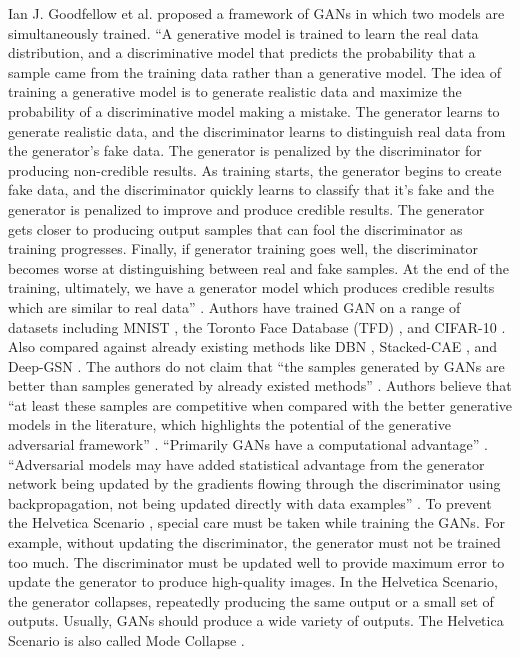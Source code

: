 Ian J. Goodfellow et al.\cite{goodfellow2014generative} proposed a framework of \acp{GAN} in which two models are simultaneously trained. ``A generative model is trained to learn the real data distribution, and a discriminative model that predicts the probability that a sample came from the training data rather than a generative model. The idea of training a generative model is to generate realistic data and maximize the probability of a discriminative model making a mistake. The generator learns to generate realistic data, and the discriminator learns to distinguish real data from the generator's fake data. The generator is penalized by the discriminator for producing non-credible results. As training starts, the generator begins to create fake data, and the discriminator quickly learns to classify that it's fake and the generator is penalized to improve and produce credible results. The generator gets closer to producing output samples that can fool the discriminator as training progresses. Finally, if generator training goes well, the discriminator becomes worse at distinguishing between real and fake samples.  At the end of the training, ultimately, we have a generator model which produces credible results which are similar to real data'' \cite{goodfellow2014generative}. Authors have trained \ac{GAN} on a range of datasets including MNIST \cite{726791}, the Toronto Face Database (TFD) \cite{susskind2010toronto}, and CIFAR-10 \cite{krizhevsky2009learning}. Also compared against already existing methods like \ac{DBN} \cite{bengio2012better}, \ac{Stacked-CAE} \cite{bengio2012better}, and \ac{Deep-GSN} \cite{bengio2014deep}. The authors do not claim that ``the samples generated by \acp{GAN} are better than samples generated by already existed methods'' \cite{goodfellow2014generative}. Authors believe that ``at least these samples are competitive when compared with the better generative models in the literature, which highlights the potential of the generative adversarial framework'' \cite{goodfellow2014generative}. ``Primarily \acp{GAN} have a computational advantage'' \cite{goodfellow2014generative}. ``Adversarial models may have added statistical advantage from the generator network being updated by the gradients flowing through the discriminator using backpropagation, not being updated directly with data examples'' \cite{goodfellow2014generative}. To prevent the Helvetica Scenario \cite{manisha2019generative}, special care must be taken while training the \acp{GAN}. For example, without updating the discriminator, the generator must not be trained too much. The discriminator must be updated well to provide maximum error to update the generator to produce high-quality images. In the Helvetica Scenario, the generator collapses, repeatedly producing the same output or a small set of outputs. Usually, \acp{GAN} should produce a wide variety of outputs. The Helvetica Scenario is also called Mode Collapse \cite{thanhtung2020catastrophic}.





